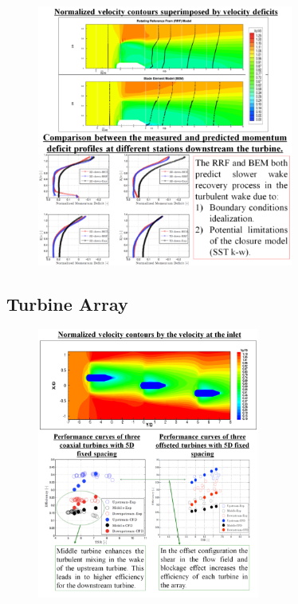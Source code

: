 \documentclass[xcolor=x11names,compress]{beamer}
\renewcommand{\(}{\begin{columns}}
\renewcommand{\)}{\end{columns}}
\newcommand{\<}[1]{\begin{column}{#1}}
\renewcommand{\>}{\end{column}}
\begin{document}
	\begin{frame}{}

		\begin{figure}[p]
		    \centering
		    \includegraphics[width=0.75\textwidth]{figures/validation-RANS-experiment_single-turbine_performance-and-wake-1.png}
		    \label{fig:single-turbine}
		\end{figure}

	\end{frame}

\subsection{Turbine Array}
	
	\begin{frame}{}

		\begin{figure}[p]
		    \centering
		    \includegraphics[width=0.65\textwidth]{figures/validation-RANS-experiment_turbine-array_performance-and-wake-1.png}
		    \label{fig:turbine-array}
		\end{figure}

	\end{frame}
\end{document}
